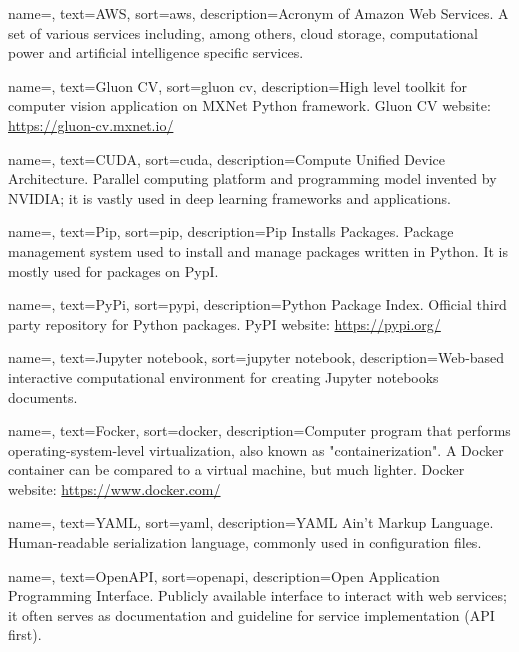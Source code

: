 {
	name=,
	text=AWS,
	sort=aws,
	description={Acronym of Amazon Web Services. A set of various services including, among others, cloud storage, computational power and artificial intelligence specific services.}
}

{
	name=,
	text=Gluon CV,
	sort=gluon cv,
	description={High level toolkit for computer vision application on MXNet Python framework. Gluon CV website: \url{https://gluon-cv.mxnet.io/}}
}

{
	name=,
	text=CUDA,
	sort=cuda,
	description={Compute Unified Device Architecture. Parallel computing platform and programming model invented by NVIDIA; it is vastly used in deep learning frameworks and applications.}
}

{
	name=,
	text=Pip,
	sort=pip,
	description={Pip Installs Packages. Package management system used to install and manage packages written in Python. It is mostly used for packages on PypI.}
}

{
	name=,
	text=PyPi,
	sort=pypi,
	description={Python Package Index. Official third party repository for Python packages. PyPI website: \url{https://pypi.org/}}
}

{
	name=,
	text=Jupyter notebook,
	sort=jupyter notebook,
	description={Web-based interactive computational environment for creating Jupyter notebooks documents.}
}

{
	name=,
	text=Focker,
	sort=docker,
	description={Computer program that performs operating-system-level virtualization, also known as "containerization". A Docker container can be compared to a virtual machine, but much lighter. Docker website: \url{https://www.docker.com/}}
}

{
	name=,
	text=YAML,
	sort=yaml,
	description={YAML Ain't Markup Language. Human-readable serialization language, commonly used in configuration files.}
}

{
	name=,
	text=OpenAPI,
	sort=openapi,
	description={Open Application Programming Interface. Publicly available interface to interact with web services; it often serves as documentation and guideline for service implementation (API first).}
}

